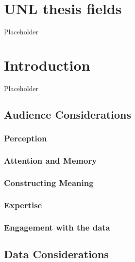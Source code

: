 \documentclass[print]{nuthesis}
\begin{document}
\hypertarget{unl-thesis-fields}{%
\chapter{UNL thesis fields}\label{unl-thesis-fields}}

Placeholder

\hypertarget{introduction}{%
\chapter{Introduction}\label{introduction}}

Placeholder

\hypertarget{audience-considerations}{%
\section{Audience Considerations}\label{audience-considerations}}

\hypertarget{perception}{%
\subsection{Perception}\label{perception}}

\hypertarget{attention-and-memory}{%
\subsection{Attention and Memory}\label{attention-and-memory}}

\hypertarget{constructing-meaning}{%
\subsection{Constructing Meaning}\label{constructing-meaning}}

\hypertarget{expertise}{%
\subsection{Expertise}\label{expertise}}

\hypertarget{engagement-with-the-data}{%
\subsection{Engagement with the data}\label{engagement-with-the-data}}

\hypertarget{data-considerations}{%
\section{Data Considerations}\label{data-considerations}}
\end{document}

